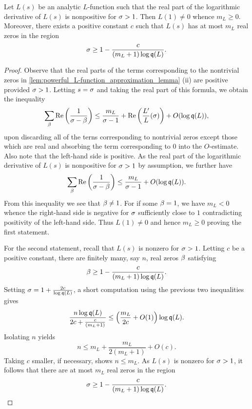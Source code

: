     \begin{lemma}\label{lem:non-vanshing_at_1_lemma}
      Let \(L(s)\) be an analytic \(L\)-function such that the real part of the logarithmic derivative of \(L(s)\) is nonpositive for \(\sigma > 1\). Then \(L(1) \neq 0\) whence \(m_{L} \ge 0\). Moreover, there exists a positive constant \(c\) such that \(L(s)\) has at most \(m_{L}\) real zeros in the region
      \[
        \sigma \ge 1-\frac{c}{(m_{L}+1)\log{\mathfrak{q}(L)}}.
      \]
    \end{lemma}
    \begin{proof}
      Observe that the real parts of the terms corresponding to the nontrivial zeros in \cref{lem:powerful_L-function_approximation_lemma} (ii) are positive provided \(\sigma > 1\). Letting \(s = \sigma\) and taking the real part of this formula, we obtain the inequality
      \[
        \sum_{\beta}\mathrm{Re}\left(\frac{1}{\sigma-\beta}\right) \le \frac{m_{L}}{\sigma-1}+\mathrm{Re}\left(\frac{L'}{L}(\sigma)\right)+O(\log{\mathfrak{q}(L)}),
      \]
      upon discarding all of the terns corresponding to nontrivial zeros except those which are real and absorbing the term corresponding to \(0\) into the \(O\)-estimate. Also note that the left-hand side is positive. As the real part of the logarithmic derivative of \(L(s)\) is nonpositive for \(\sigma > 1\) by assumption, we further have
      \[
        \sum_{\beta}\mathrm{Re}\left(\frac{1}{\sigma-\beta}\right) \le \frac{m_{L}}{\sigma-1}+O(\log{\mathfrak{q}(L)}).
      \]
      From this inequality we see that \(\beta \neq 1\). For if some \(\beta = 1\), we have \(m_{L} < 0\) whence the right-hand side is negative for \(\sigma\) sufficiently close to \(1\) contradicting positivity of the left-hand side. Thus \(L(1) \neq 0\) and hence \(m_{L} \ge 0\) proving the first statement.
      
      For the second statement, recall that \(L(s)\) is nonzero for \(\sigma > 1\). Letting \(c\) be a positive constant, there are finitely many, say \(n\), real zeros \(\beta\) satisfying
      \[
        \beta \ge 1-\frac{c}{(m_{L}+1)\log{\mathfrak{q}(L)}}.
      \]
      Setting \(\sigma = 1+\frac{2c}{\log{\mathfrak{q}(L)}}\), a short computation using the previous two inequalities gives
      \[
        \frac{n\log{\mathfrak{q}(L)}}{2c+\frac{c}{(m_{L}+1)}} \le \left(\frac{m_{L}}{2c}+O(1)\right)\log{\mathfrak{q}(L)}.
      \]
      Isolating \(n\) yields
      \[
        n \le m_{L}+\frac{m_{L}}{2(m_{L}+1)}+O(c).
      \]
      Taking \(c\) smaller, if necessary, shows \(n \le m_{L}\). As \(L(s)\) is nonzero for \(\sigma > 1\), it follows that there are at most \(m_{L}\) real zeros in the region
      \[
        \sigma \ge 1-\frac{c}{(m_{L}+1)\log{\mathfrak{q}(L)}}.
      \]
    \end{proof}


